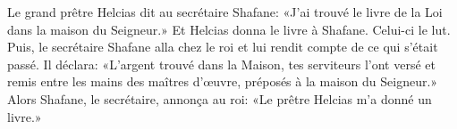Le grand prêtre Helcias dit au secrétaire Shafane:
	«J’ai trouvé le livre de la Loi dans la maison du Seigneur.»
Et Helcias donna le livre à Shafane.
	Celui-ci le lut.
Puis, le secrétaire Shafane alla chez le roi et lui rendit compte de ce qui s’était passé.
Il déclara: «L’argent trouvé dans la Maison,
	tes serviteurs l’ont versé et remis entre les mains des maîtres d’œuvre,
	préposés à la maison du Seigneur.»
Alors Shafane, le secrétaire, annonça au roi:
	«Le prêtre Helcias m’a donné un livre.»
